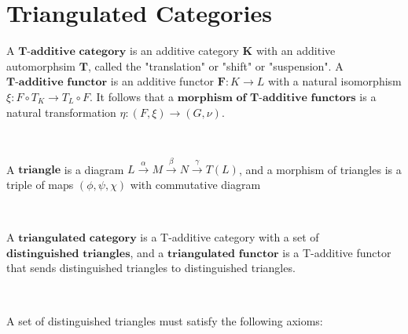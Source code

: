 \documentclass[12pt]{amsart}    %
\theoremstyle{definition}
\begin{document}
\section{Triangulated Categories}

A $\textbf{T-additive category}$ is an additive category $\textbf{K}$ with an additive automorphsim $\textbf{T}$, called the "translation" or "shift" or "suspension".  A $\textbf{T-additive functor}$ is an additive functor $\textbf{F}: K \rightarrow L$ with a natural isomorphism $\xi: F \circ T_K \rightarrow T_L \circ F$.  It follows that a $\textbf{morphism of T-additive functors}$ is a natural transformation $\eta: (F,\xi) \rightarrow (G, \nu)$.

\

A $\textbf{triangle}$ is a diagram $L \xrightarrow{\alpha} M \xrightarrow{\beta} N \xrightarrow{\gamma} T(L)$, and a morphism of triangles is a triple of maps $(\phi, \psi, \chi)$ with commutative diagram

\

\begin{center}
\end{center}



A $\textbf{triangulated category}$ is a T-additive category with a set of $\textbf{distinguished triangles}$, and a $\textbf{triangulated functor}$ is a T-additive functor that sends distinguished triangles to distinguished triangles.

\

A set of distinguished triangles must satisfy the following axioms:

\
\end{document}
